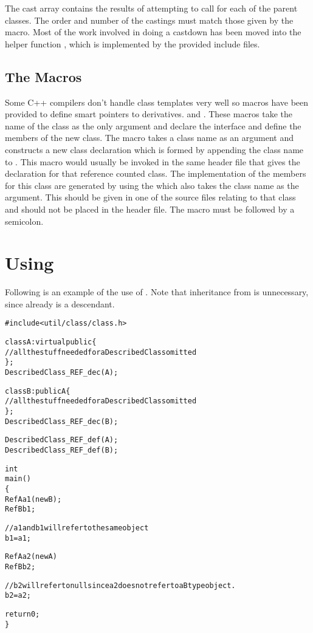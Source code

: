 The cast array contains the results of attempting to call
 for each of the parent classes.  The order and
number of the castings must match those given by the 
macro.  Most of the work involved in doing a castdown has been
moved into the helper function , which is
implemented by the provided include files.

\subsection{The  Macros}

Some C++ compilers don't handle class templates very well so
 macros have been provided to define smart
pointers to  derivatives.
 and .  These macros take the
name of the  class as the only
argument and declare the interface and define the members of
the new  class.  The
 macro takes a class name as
an argument and constructs a new class declaration which is
formed by appending the class name to .  This
macro would usually be invoked in the same header file that
gives the declaration for that reference counted class.  The
implementation of the members for this class are generated
by using the  which also
takes the class name as the argument.  This should be given
in one of the source files relating to that class and should
not be placed in the header file.  The
 macro must be followed by a
semicolon.

\section{Using }

Following is an example of the use of .
Note that inheritance from 
is unnecessary, since  already is a
 descendant.

\begin{alltt}
#include <util/class/class.h>

class A: virtual public  \{
 // all the stuff needed for a DescribedClass omitted
\};
DescribedClass_REF_dec(A);

class B: public A \{
 // all the stuff needed for a DescribedClass omitted
\};
DescribedClass_REF_dec(B);

DescribedClass_REF_def(A);
DescribedClass_REF_def(B);

int
main()
\{
  RefA a1(new B);
  RefB b1;

  // a1 and b1 will refer to the same object
  b1 = a1;

  RefA a2(new A)
  RefB b2;

  // b2 will refer to null since a2 does not refer to a B type object.
  b2 = a2;

  return 0;
\}

\end{alltt}
